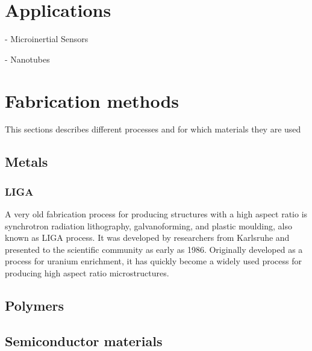 \documentclass[a4paper,
  twoside, %
  headlines=2.1 %
  ]{scrartcl}
\begin{document}
\section{Applications}
- Microinertial Sensors

- Nanotubes

\section{Fabrication methods}
This sections describes different processes and for which materials they are used

\subsection{Metals}
\subsubsection{LIGA}
A very old fabrication process for producing structures with a high aspect ratio is synchrotron radiation lithography, galvanoforming, and plastic moulding, also known as LIGA process. It was developed by researchers from Karlsruhe and presented to the scientific community as early as 1986. \cite{BECKER198635} Originally developed as a process for uranium enrichment, it has quickly become a widely used process for producing high aspect ratio microstructures.

\subsection{Polymers}

\subsection{Semiconductor materials}
\end{document}
